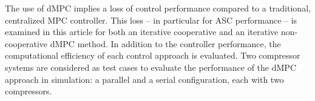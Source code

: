 The use of dMPC implies a loss of control performance compared to a traditional, centralized MPC controller.
This loss -- in particular for ASC performance -- is examined in this article for both an iterative cooperative and an iterative non-cooperative dMPC method.
In addition to the controller performance, the computational efficiency of each control approach is evaluated.
Two compressor systems are considered as test cases to evaluate the performance of the dMPC approach in simulation: a parallel and a serial configuration, each with two compressors.

